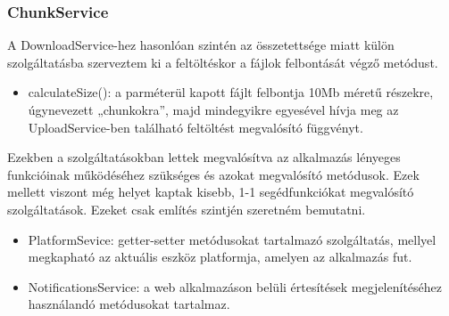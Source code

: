 \documentclass[12pt, twoside]{report}
\begin{document}
\subsubsection{ChunkService}
A DownloadService-hez hasonlóan szintén az összetettsége miatt külön szolgáltatásba szerveztem ki a feltöltéskor a fájlok felbontását végző metódust.

\begin{itemize}
	\item calculateSize(): a parméterül kapott fájlt felbontja 10Mb méretű részekre, úgynevezett „chunkokra”, majd mindegyikre egyesével hívja meg az UploadService-ben található feltöltést megvalósító függvényt.
\end{itemize}

Ezekben a szolgáltatásokban lettek megvalósítva az alkalmazás lényeges funkcióinak működéséhez szükséges és azokat megvalósító metódusok. Ezek mellett viszont még helyet kaptak kisebb, 1-1 segédfunkciókat megvalósító szolgáltatások. Ezeket csak említés szintjén szeretném bemutatni.

\begin{itemize}
	\item PlatformSevice: getter-setter metódusokat tartalmazó szolgáltatás, mellyel megkapható az aktuális eszköz platformja, amelyen az alkalmazás fut.
	\item NotificationsService: a web alkalmazáson belüli értesítések megjelenítéséhez használandó metódusokat tartalmaz.
\end{itemize}
\end{document}

